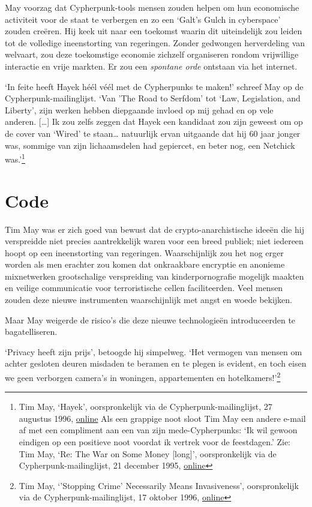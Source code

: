 \documentclass[smalldemyvopaper,11pt,twoside,onecolumn,openright,extrafontsizes,hidelinks]{memoir}
\begin{document}
May voorzag dat Cypherpunk-tools mensen zouden helpen om hun economische
activiteit voor de staat te verbergen en zo een `Galt's Gulch in
cyberspace' zouden creëren. Hij keek uit naar een toekomst waarin dit
uiteindelijk zou leiden tot de volledige ineenstorting van regeringen.
Zonder gedwongen herverdeling van welvaart, zou deze toekomstige
economie zichzelf organiseren rondom vrijwillige interactie en vrije
markten. Er zou een \emph{spontane orde} ontstaan via het internet.

`In feite heeft Hayek héél véél met de Cypherpunks te maken!' schreef
May op de Cypherpunk-mailinglijst. `Van 'The Road to Serfdom' tot `Law,
Legislation, and Liberty', zijn werken hebben diepgaande invloed op mij
gehad en op vele anderen. {[}\ldots{]} Ik zou zelfs zeggen dat Hayek een
kandidaat zou zijn geweest om op de cover van `Wired' te staan\ldots{}
natuurlijk ervan uitgaande dat hij 60 jaar jonger was, sommige van zijn
lichaamsdelen had gepiercet, en beter nog, een Netchick was.'\footnote{Tim
  May, `Hayek', oorspronkelijk via de Cypherpunk-mailinglijst, 27
  augustus 1996,
  \href{https://cypherpunks.venona.com/date/1996/08/msg02102.html}{online}
  Als een grappige noot sloot Tim May een andere e-mail af met een
  compliment aan een van zijn mede-Cypherpunks: `Ik wil gewoon eindigen
  op een positieve noot voordat ik vertrek voor de feestdagen.' Zie: Tim
  May, `Re: The War on Some Money {[}long{]}', oorspronkelijk via de
  Cypherpunk-mailinglijst, 21 december 1995,
  \href{https://cypherpunks.venona.com/date/1995/12/msg01044.html}{online}}

\section{Code}\label{code}

Tim May was er zich goed van bewust dat de crypto-anarchistische ideeën
die hij verspreidde niet precies aantrekkelijk waren voor een breed
publiek; niet iedereen hoopt op een ineenstorting van regeringen.
Waarschijnlijk zou het nog erger worden als men erachter zou komen dat
onkraakbare encryptie en anonieme mixnetwerken grootschalige
verspreiding van kinderpornografie mogelijk maakten en veilige
communicatie voor terroristische cellen faciliteerden. Veel mensen
zouden deze nieuwe instrumenten waarschijnlijk met angst en woede
bekijken.

Maar May weigerde de risico's die deze nieuwe technologieën
introduceerden te bagatelliseren.

`Privacy heeft zijn prijs', betoogde hij simpelweg. `Het vermogen van
mensen om achter gesloten deuren misdaden te beramen en te plegen is
evident, en toch eisen we geen verborgen camera's in woningen,
appartementen en hotelkamers!'\footnote{Tim May, `'Stopping Crime'
  Necessarily Means Invasiveness', oorspronkelijk via de
  Cypherpunk-mailinglijst, 17 oktober 1996,
  \href{https://cypherpunks.venona.com/date/1996/10/msg01269.html}{online}}
\end{document}

